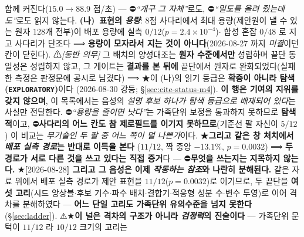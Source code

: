 \documentclass[11pt]{report}
\numberwithin{equation}{chapter}
\numberwithin{figure}{chapter}
\numberwithin{table}{chapter}
\begin{document}
\begin{enumerate}
        함께 커진다($15.0 \to 88.9$ 점/초) --- ⛔\emph{``개구 그 자체''}로도,
        ⛔\emph{``밀도를 올려 줬는데도''}로도 읽지 않는다.
        \textbf{(나)~표현의 \emph{용량}}: $8$점 사다리에서 최대 용량(제안원이 낼 수 있는
        원자 $128$개 전부)이 배포 용량에 실측 \textbf{$0/12$}($p = 2.4\times10^{-4}$)$\cdot$
        합성 혼잡 \textbf{$0/48$} 로 지고 사다리가 단조다 ⟹ \textbf{용량이 모자라서 지는
        것이 아니다}(2026-08-27 까지 \emph{미결}이던 칸이 닫힌다).
        ⚠\emph{[동반 의무]} 그 배치의 양성대조는 \textbf{원자 수준에서만} 성립하며 끝단
        동일성은 성립하지 않고, 그 게이트는 \textbf{결과를 본 뒤에} 끝단에서 원자로
        완화되었다(실패한 측정은 판정문에 공시로 남겼다)
        ⟹ ★이 (나)의 읽기 등급은 \textbf{확증이 아니라 탐색(\texttt{EXPLORATORY})}이다
        (2026-08-30 강등; \S\ref{sec:cite-status-m4}). \textbf{이 행은 기여의 지위를
        갖지 않으며}, 이 목록에서는 음성의 \emph{설명 후보 하나가 탐색 등급으로 배제되어
        있다}는 사실만 전달한다.
        ⛔\emph{``용량을 줄이면 낫다''}는 가족단위 보정을 통과하지 못하므로 \textbf{탐색적}이고,
        ⛔\textbf{사다리의 어느 칸도 참 제로필드를 이기지 못하므로}(기준선 팔 자신이 $5/12$)
        이 비교는 \emph{무기술인 두 팔 중 어느 쪽이 덜 나쁜가}이다.
        ★\textbf{그리고 같은 창 처치에서 \emph{배포 실측 경로}는 반대로 이득을 본다}
        ($11/12$, 짝 중앙 $-13.1\%$, $p = 0.0032$) ⟹ \textbf{두 경로가 서로 다른 것을
        쓰고 있다는 직접 증거}다 --- ⛔\textbf{무엇을 쓰는지는 지목하지 않는다.}
        ★\textbf{[$2026$-$08$-$28$] 그리고 그 음성은 이제 \emph{작동하는 참조}와 나란히
        분해된다.} 같은 자료 위에서 배포 실측 경로가 제안 표현을 $11/12$($p = 0.0032$)로
        이기므로, 두 끝단을 \textbf{여섯 고리}(시드 앙상블$\cdot$후보 기수$\cdot$파수
        배치$\cdot$결합기$\cdot$적응형 성분 수$\cdot$변수 투영)로 이어 격차를 분해하였다
        --- \textbf{어느 단일 고리도 가족단위 유의수준을 넘지 못한다}
        (\S\ref{sec:ladder}). ⚠★\textbf{이 널은 격차의 구조가 아니라 \emph{검정력}의
        진술이다} --- 가족단위 문턱이 \textbf{$11/12$} 라 $10/12$ 크기의 고리는

\end{enumerate}
\end{document}
